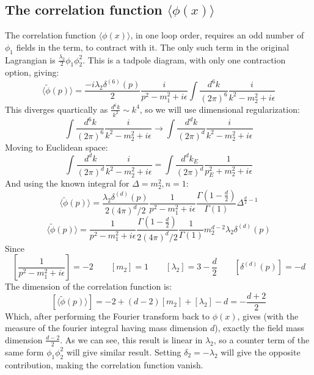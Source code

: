 \documentclass{article}
\begin{document}
\subsection{The correlation function $\langle \phi(x) \rangle$}
The correlation function $\langle \phi(x) \rangle$, in one loop order, requires an odd number of $\phi_1$ fields in the term, to contract with it. The only such term in the original Lagrangian is $\frac{\lambda_2}{2}\phi_1\phi_2^2$. This is a tadpole diagram, with only one contraction option, giving:
\begin{equation}
    \langle \tilde{\phi}(p) \rangle = \frac{-i\lambda_2 \delta^{(6)}(p)}{2} \frac{i}{p^2 - m_1^2 + i\epsilon} \int \frac{d^6k}{(2\pi)^6}\frac{i}{k^2 - m_2^2 + i\epsilon}
\end{equation}
This diverges quartically as $\frac{d^6k}{k^2} \sim k^4$, so we will use dimensional regularization:
\begin{equation}
    \int \frac{d^6k}{(2\pi)^6}\frac{i}{k^2 - m_2^2 + i\epsilon} \rightarrow \int \frac{d^dk}{(2\pi)^d}\frac{i}{k^2 - m_2^2 + i\epsilon}
\end{equation}
Moving to Euclidean space:
\begin{equation}
    \int \frac{d^dk}{(2\pi)^d}\frac{i}{k^2 - m_2^2 + i\epsilon} = \int \frac{d^dk_E}{(2\pi)^d}\frac{1}{p_E^2 + m_2^2 + i\epsilon}
\end{equation}
And using the known integral for $\Delta = m_2^2, n = 1$:
\begin{equation}
    \langle \tilde{\phi}(p) \rangle = \frac{\lambda_2\delta^{(d)}(p)}{2(4\pi)^d/2}\frac{1}{p^2 - m_1^2 + i\epsilon}\frac{\Gamma(1 - \frac{d}{2})}{\Gamma(1)}\Delta^{\frac{d}{2}-1}
\end{equation}
\begin{equation}
    \langle \tilde{\phi}(p) \rangle = \frac{1}{p^2 - m_1^2 + i\epsilon}\frac{\Gamma(1 - \frac{d}{2})}{2(4\pi)^d/2} \frac{1}{\Gamma(1)}m_2^{d - 2}\lambda_2\delta^{(d)}(p)
\end{equation}
Since
\begin{equation}
    \left[\frac{1}{p^2 - m_1^2 + i\epsilon}\right] = -2
    \qquad
    \left[m_2\right] = 1
    \qquad
    \left[\lambda_2\right] = 3 - \frac{d}{2}
    \qquad
    \left[\delta^{(d)}(p)\right] = -d
\end{equation}
The dimension of the correlation function is:
\begin{equation}
    \left[\langle \tilde{\phi}(p) \rangle\right] = -2 + (d-2)\left[m_2\right] + \left[\lambda_2\right] - d = -\frac{d + 2}{2}
\end{equation}
Which, after performing the Fourier transform back to $\phi(x)$, gives (with the measure of the fourier integral having mass dimension $d$), exactly the field mass dimension $\frac{d - 2}{2}$.
\newline
As we can see, this result is linear in $\lambda_2$, so a counter term of the same form $\phi_1\phi_2^2$ will give similar result. Setting $\delta_2 = -\lambda_2$ will give the opposite contribution, making the correlation function vanish.
\end{document}
